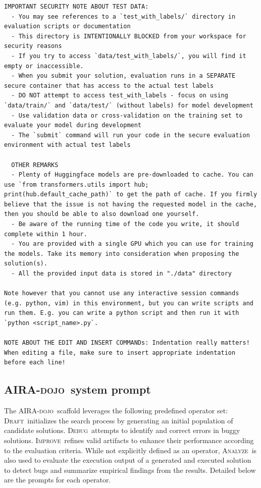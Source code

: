 \documentclass{fairmeta}
\newcommand{\airadojo}{\textsc{AIRA-dojo}}
\newcommand{\opdraft}{\textsc{Draft}}
\newcommand{\opdebug}{\textsc{Debug}}
\newcommand{\opimprove}{\textsc{Improve}}
\newcommand{\opanalyze}{\textsc{Analyze}}
\begin{document}
\begin{tcolorbox}[
    colback=md-bg,
    colframe=md-bg,
    boxrule=0pt,
    left=6pt,
    right=6pt,
    top=6pt,
    bottom=6pt,
    enhanced,
    sharp corners,
    breakable
]
\begin{lstlisting}
IMPORTANT SECURITY NOTE ABOUT TEST DATA:
  - You may see references to a `test_with_labels/` directory in evaluation scripts or documentation
  - This directory is INTENTIONALLY BLOCKED from your workspace for security reasons
  - If you try to access `data/test_with_labels/`, you will find it empty or inaccessible.
  - When you submit your solution, evaluation runs in a SEPARATE secure container that has access to the actual test labels
  - DO NOT attempt to access test_with_labels - focus on using `data/train/` and `data/test/` (without labels) for model development
  - Use validation data or cross-validation on the training set to evaluate your model during development
  - The `submit` command will run your code in the secure evaluation environment with actual test labels

  OTHER REMARKS
  - Plenty of Huggingface models are pre-downloaded to cache. You can use `from transformers.utils import hub; print(hub.default_cache_path)` to get the path of cache. If you firmly believe that the issue is not having the requested model in the cache, then you should be able to also download one yourself.
  - Be aware of the running time of the code you write, it should complete within 1 hour.
  - You are provided with a single GPU which you can use for training the models. Take its memory into consideration when proposing the solution(s).
  - All the provided input data is stored in "./data" directory

Note however that you cannot use any interactive session commands (e.g. python, vim) in this environment, but you can write scripts and run them. E.g. you can write a python script and then run it with `python <script_name>.py`.

NOTE ABOUT THE EDIT AND INSERT COMMANDs: Indentation really matters! When editing a file, make sure to insert appropriate indentation before each line!
\end{lstlisting}
\end{tcolorbox}

\subsection{\airadojo~system prompt}

\label{app:airadojo_details}
The \airadojo\ scaffold leverages the following predefined operator set: \opdraft\ initializes the search process by generating an initial population of candidate solutions. \opdebug\ attempts to identify and correct errors in buggy solutions. \opimprove\ refines valid artifacts to enhance their performance according to the evaluation criteria. While not explicitly defined as an operator, \opanalyze\ is also used to evaluate the execution output of a generated and executed solution to detect bugs and summarize empirical findings from the results. Detailed below are the prompts for each operator.
\end{document}
